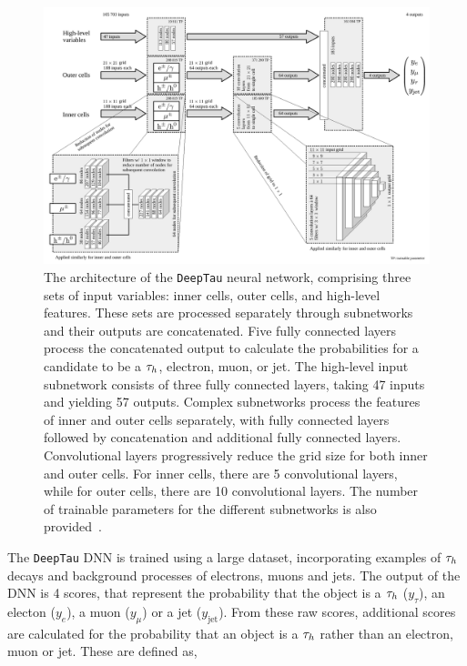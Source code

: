 \begin{figure}[!hbtp]
\centering
    \includegraphics[width=\textwidth]{Figures/deeptau.pdf}
\caption{The architecture of the \texttt{DeepTau} neural network, comprising three sets of input variables: inner cells, outer cells, and high-level features. These sets are processed separately through subnetworks and their outputs are concatenated. Five fully connected layers process the concatenated output to calculate the probabilities for a candidate to be a $\tau_{h}$, electron, muon, or jet. The high-level input subnetwork consists of three fully connected layers, taking 47 inputs and yielding 57 outputs. Complex subnetworks process the features of inner and outer cells separately, with fully connected layers followed by concatenation and additional fully connected layers. Convolutional layers progressively reduce the grid size for both inner and outer cells. For inner cells, there are 5 convolutional layers, while for outer cells, there are 10 convolutional layers. The number of trainable parameters for the different subnetworks is also provided~\cite{CMS:2022prd}.}
\label{fig:deeptau}
\end{figure}

The \texttt{DeepTau} \ac{DNN} is trained using a large dataset, incorporating examples of $\tau_{h}$ decays and background processes of electrons, muons and jets. 
The output of the \ac{DNN} is 4 scores, that represent the probability that the object is a $\tau_{h}$ ($y_\tau$), an electon ($y_e$), a muon ($y_\mu$) or a jet ($y_{\text{jet}}$).
From these raw scores, additional scores are calculated for the probability that an object is a $\tau_{h}$ rather than an electron, muon or jet.
These are defined as,

